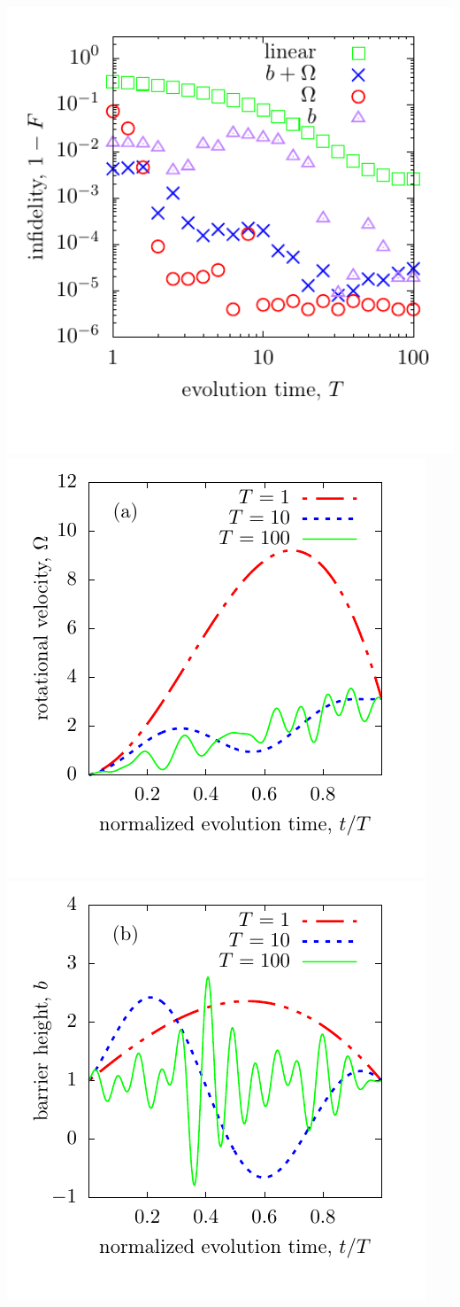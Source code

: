 \documentclass{beamer}
\begin{document}
\begin{frame}
\begin{columns}
\end{columns}

\begin{columns}
\includegraphics[width=1.2\textwidth]{../data/1d/figlfid.pdf}
\includegraphics[width=.49\textwidth]{../data/1d/figR1.pdf}
\includegraphics[width=.49\textwidth]{../data/1d/figB1.pdf}
\end{columns}
\end{frame}
\end{document}
